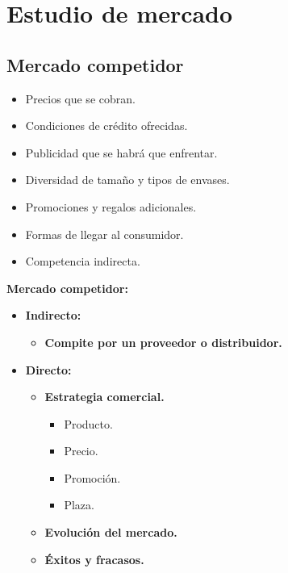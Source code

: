 \documentclass{templateNote}
\begin{document}
\newpage
\section{Estudio de mercado}

\subsection{Mercado competidor}
\begin{itemize}
    \item Precios que se cobran.
    \item Condiciones de crédito ofrecidas.
    \item Publicidad que se habrá que enfrentar.
    \item Diversidad de tamaño y tipos de envases.
    \item Promociones y regalos adicionales.
    \item Formas de llegar al consumidor.
    \item Competencia indirecta.
\end{itemize}

\textbf{Mercado competidor:}
\begin{itemize}
    \item \textbf{Indirecto:}
    \begin{itemize}
        \item \textbf{Compite por un proveedor o distribuidor.}
    \end{itemize}
    \item \textbf{Directo:}
    \begin{itemize}
        \item \textbf{Estrategia comercial.}
        \begin{itemize}
            \item Producto.
            \item Precio.
            \item Promoción.
            \item Plaza.
        \end{itemize}
        \item \textbf{Evolución del mercado.}
        \item \textbf{Éxitos y fracasos.}
    \end{itemize}
\end{itemize}
\end{document}
